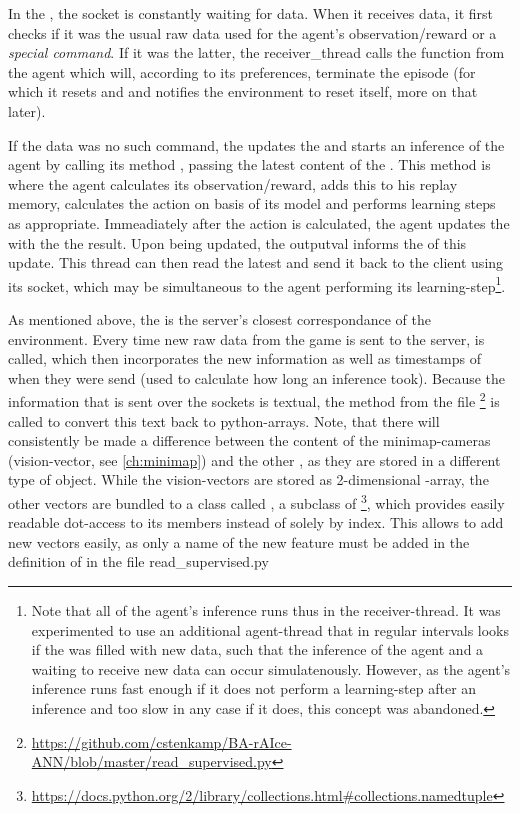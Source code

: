 In the , the socket is constantly waiting for data. When it receives data, it first checks if it was the usual raw data used for the agent's observation/reward or a \textit{special command}. If it was the latter, the receiver\_thread calls the function  from the agent which will, according to its preferences, terminate the episode (for which it resets  and  and notifies the environment to reset itself, more on that later). 

If the data was no such command, the  updates the  and starts an inference of the agent by calling its method , passing the latest content of the . This method is where the agent calculates its observation/reward, adds this to his replay memory, calculates the action on basis of its model and performs learning steps as appropriate. Immeadiately after the action is calculated, the agent updates the  with the the result. Upon being updated, the outputval informs the  of this update. This thread can then read the latest  and send it back to the client using its socket, which may be simultaneous to the agent performing its learning-step\footnote{Note that all of the agent's inference runs thus in the receiver-thread. It was experimented to use an additional agent-thread that in regular intervals looks if the  was filled with new data, such that the inference of the agent and a waiting to receive new data can occur simulatenously. However, as the agent's inference runs fast enough if it does not perform a learning-step after an inference and too slow in any case if it does, this concept was abandoned.}. 

As mentioned above, the  is the server's closest correspondance of the environment. Every time new raw data from the game is sent to the server,  is called, which then incorporates the new information as well as timestamps of when they were send (used to calculate how long an inference took). Because the information that is sent over the sockets is textual, the method  from the file \footnote{\url{https://github.com/cstenkamp/BA-rAIce-ANN/blob/master/read_supervised.py}} is called to convert this text back to python-arrays. Note, that there will consistently be made a difference between the content of the minimap-cameras (vision-vector, see \ref{ch:minimap}) and the other , as they are stored in a different type of object. While the vision-vectors are stored as 2-dimensional -array, the other vectors are bundled to a class called , a subclass of  \footnote{\url{https://docs.python.org/2/library/collections.html#collections.namedtuple}}, which provides easily readable dot-access to its members instead of solely by index. This allows to add new vectors easily, as only a name of the new feature must be added in the definition of  in the file read\_supervised.py

